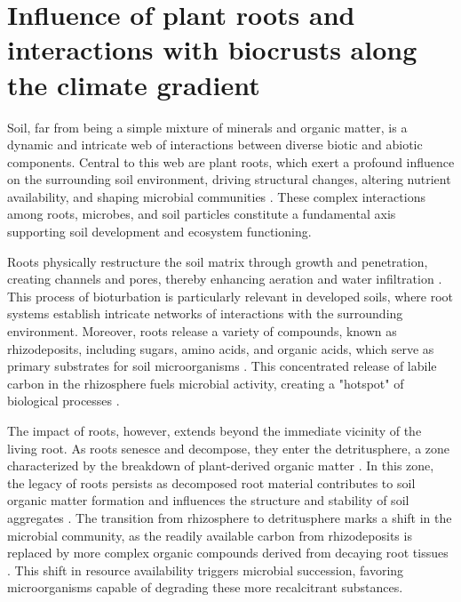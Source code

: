\section{Influence of plant roots and interactions with biocrusts along the climate gradient}
\label{sec:PlantRootsBiocrust}

Soil, far from being a simple mixture of minerals and organic matter, is a dynamic and intricate web of interactions between diverse biotic and abiotic components. Central to this web are plant roots, which exert a profound influence on the surrounding soil environment, driving structural changes, altering nutrient availability, and shaping microbial communities \citep{Hinsinger2009}. These complex interactions among roots, microbes, and soil particles constitute a fundamental axis supporting soil development and ecosystem functioning.

Roots physically restructure the soil matrix through growth and penetration, creating channels and pores, thereby enhancing aeration and water infiltration \citep{Bruand1996}. This process of bioturbation is particularly relevant in developed soils, where root systems establish intricate networks of interactions with the surrounding environment. Moreover, roots release a variety of compounds, known as rhizodeposits, including sugars, amino acids, and organic acids, which serve as primary substrates for soil microorganisms \citep{Hinsinger2009,Rasse2005}. This concentrated release of labile carbon in the rhizosphere fuels microbial activity, creating a "hotspot" of biological processes \citep{Hinsinger2009}.

The impact of roots, however, extends beyond the immediate vicinity of the living root. As roots senesce and decompose, they enter the detritusphere, a zone characterized by the breakdown of plant-derived organic matter \citep{Vidal2018}. In this zone, the legacy of roots persists as decomposed root material contributes to soil organic matter formation and influences the structure and stability of soil aggregates \citep{Six2004}. The transition from rhizosphere to detritusphere marks a shift in the microbial community, as the readily available carbon from rhizodeposits is replaced by more complex organic compounds derived from decaying root tissues \citep{Vidal2018}. This shift in resource availability triggers microbial succession, favoring microorganisms capable of degrading these more recalcitrant substances.

